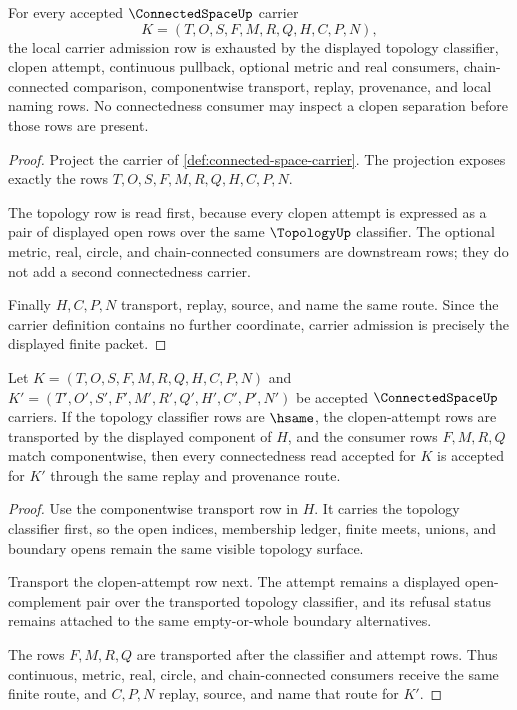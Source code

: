 \begin{theorem}
\label{thm:connected-space-carrier-admission}
For every accepted $\ConnectedSpaceUp$ carrier
$$
K=(T,O,S,F,M,R,Q,H,C,P,N),
$$
the local carrier admission row is exhausted by the displayed topology classifier, clopen attempt, continuous pullback, optional metric and real consumers, chain-connected comparison, componentwise transport, replay, provenance, and local naming rows. No connectedness consumer may inspect a clopen separation before those rows are present.
\end{theorem}
\begin{proof}
Project the carrier of \autoref{def:connected-space-carrier}. The projection exposes exactly the rows $T,O,S,F,M,R,Q,H,C,P,N$.

The topology row is read first, because every clopen attempt is expressed as a pair of displayed open rows over the same $\TopologyUp$ classifier. The optional metric, real, circle, and chain-connected consumers are downstream rows; they do not add a second connectedness carrier.

Finally $H,C,P,N$ transport, replay, source, and name the same route. Since the carrier definition contains no further coordinate, carrier admission is precisely the displayed finite packet.
\end{proof}

\begin{theorem}
\label{thm:connected-space-classifier-stability}
Let $K=(T,O,S,F,M,R,Q,H,C,P,N)$ and $K'=(T',O',S',F',M',R',Q',H',C',P',N')$ be accepted $\ConnectedSpaceUp$ carriers. If the topology classifier rows are $\hsame$, the clopen-attempt rows are transported by the displayed component of $H$, and the consumer rows $F,M,R,Q$ match componentwise, then every connectedness read accepted for $K$ is accepted for $K'$ through the same replay and provenance route.
\end{theorem}
\begin{proof}
Use the componentwise transport row in $H$. It carries the topology classifier first, so the open indices, membership ledger, finite meets, unions, and boundary opens remain the same visible topology surface.

Transport the clopen-attempt row next. The attempt remains a displayed open-complement pair over the transported topology classifier, and its refusal status remains attached to the same empty-or-whole boundary alternatives.

The rows $F,M,R,Q$ are transported after the classifier and attempt rows. Thus continuous, metric, real, circle, and chain-connected consumers receive the same finite route, and $C,P,N$ replay, source, and name that route for $K'$.
\end{proof}

